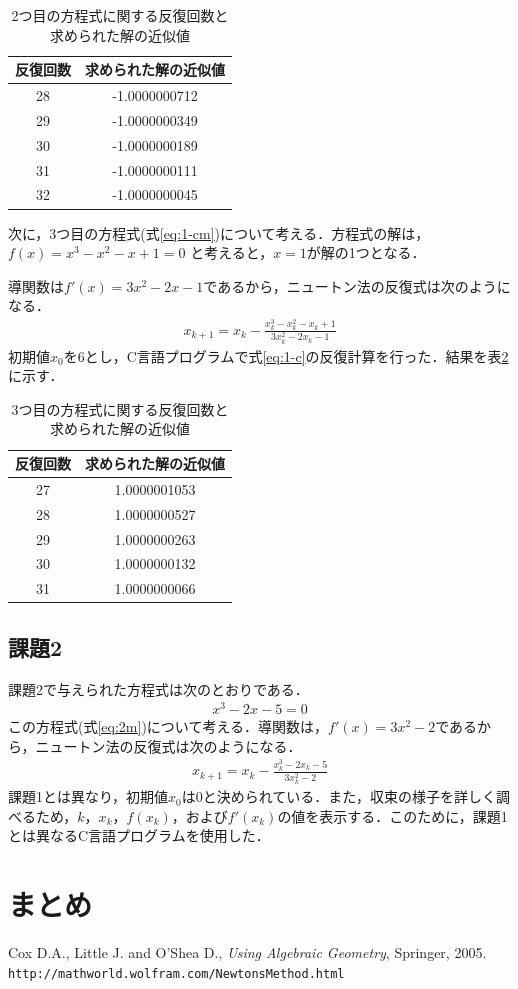 \documentclass[12pt]{jarticle}
\renewcommand  \[  {\begin{eqnarray}}
\renewcommand  \]  {\end{eqnarray}}
\begin{document}
\begin{table}[t]
 \caption{2つ目の方程式に関する反復回数と求められた解の近似値}
 \label{tab:1-b}
 \center
\begin{tabular}{|c|c|}
\hline
反復回数 &求められた解の近似値 \\
\hline
28  & -1.0000000712 \\
29  & -1.0000000349 \\
30  & -1.0000000189 \\
31  & -1.0000000111 \\
32  & -1.0000000045 \\
\hline
 \end{tabular}
\end{table}

次に，3つ目の方程式(式\ref{eq:1-cm})について考える．方程式の解は，$f(x)=x^3-x^2-x+1=0$
と考えると，$x=1$が解の1つとなる．

導関数は$f\prime(x)=3x^2-2x-1$であるから，ニュートン法の反復式は次のようになる．
\[
\label{eq:1-c}
x_{k+1}=x_k- \frac{x_k^3-x_k^2-x_k+1}{3x_k^2-2x_k-1}
\]
初期値$x_0$を$6$とし，C言語プログラムで式\ref{eq:1-c}の反復計算を行った．結果を表\ref{tab:1-c}に示す．


\begin{table}[t]
 \caption{3つ目の方程式に関する反復回数と求められた解の近似値}
 \label{tab:1-c}
 \center
\begin{tabular}{|c|c|}
\hline
反復回数 &求められた解の近似値 \\
\hline
27  & 1.0000001053 \\
28  & 1.0000000527 \\
29  & 1.0000000263 \\
30  & 1.0000000132 \\
31  & 1.0000000066 \\
\hline
 \end{tabular}
\end{table}


\subsection{課題2}
課題2で与えられた方程式は次のとおりである．
\[
x^3-2x-5 = 0
\label{eq:2m}
\]
この方程式(式\ref{eq:2m})について考える．導関数は，$f\prime(x)=3x^2-2$であるから，ニュートン法の反復式は次のようになる．
\[
x_{k+1}=x_k- \frac{x_k^3-2x_k-5}{3x_k^2-2}
\label{eq:2}
\]
課題1とは異なり，初期値$x_0$は$0$と決められている．また，収束の様子を詳しく調べるため，$k$，$x_k$，$f(x_k)$，および$f\prime(x_k)$の値を表示する．このために，課題1とは異なるC言語プログラムを使用した．


\section{まとめ}


  Cox D.A., Little J. and O'Shea D., {\em Using Algebraic Geometry}, Springer, 2005.
  \verb|http://mathworld.wolfram.com/NewtonsMethod.html|
\end{document}
